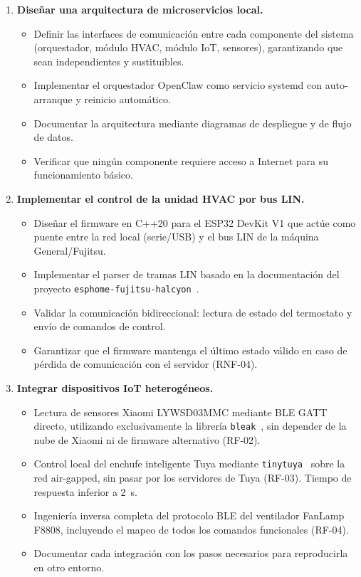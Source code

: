 \begin{enumerate}
    \item \textbf{Diseñar una arquitectura de microservicios local.}
    \begin{itemize}
        \item Definir las interfaces de comunicación entre cada componente del sistema (orquestador, módulo HVAC, módulo IoT, sensores), garantizando que sean independientes y sustituibles.
        \item Implementar el orquestador OpenClaw como servicio systemd con auto-arranque y reinicio automático.
        \item Documentar la arquitectura mediante diagramas de despliegue y de flujo de datos.
        \item Verificar que ningún componente requiere acceso a Internet para su funcionamiento básico.
    \end{itemize}

    \item \textbf{Implementar el control de la unidad HVAC por bus LIN.}
    \begin{itemize}
        \item Diseñar el firmware en C++20 para el ESP32 DevKit V1 que actúe como puente entre la red local (serie/USB) y el bus LIN de la máquina General/Fujitsu.
        \item Implementar el parser de tramas LIN basado en la documentación del proyecto \texttt{esphome-fujitsu-halcyon}~\cite{omniflux_esphome_fujitsu}.
        \item Validar la comunicación bidireccional: lectura de estado del termostato y envío de comandos de control.
        \item Garantizar que el firmware mantenga el último estado válido en caso de pérdida de comunicación con el servidor (RNF-04).
    \end{itemize}

    \item \textbf{Integrar dispositivos IoT heterogéneos.}
    \begin{itemize}
        \item Lectura de sensores Xiaomi LYWSD03MMC mediante BLE GATT directo, utilizando exclusivamente la librería \texttt{bleak}~\cite{bleak}, sin depender de la nube de Xiaomi ni de firmware alternativo (RF-02).
        \item Control local del enchufe inteligente Tuya mediante \texttt{tinytuya}~\cite{tinytuya} sobre la red air-gapped, sin pasar por los servidores de Tuya (RF-03). Tiempo de respuesta inferior a 2~s.
        \item Ingeniería inversa completa del protocolo BLE del ventilador FanLamp F8808, incluyendo el mapeo de todos los comandos funcionales (RF-04).
        \item Documentar cada integración con los pasos necesarios para reproducirla en otro entorno.
    \end{itemize}
\end{enumerate}

